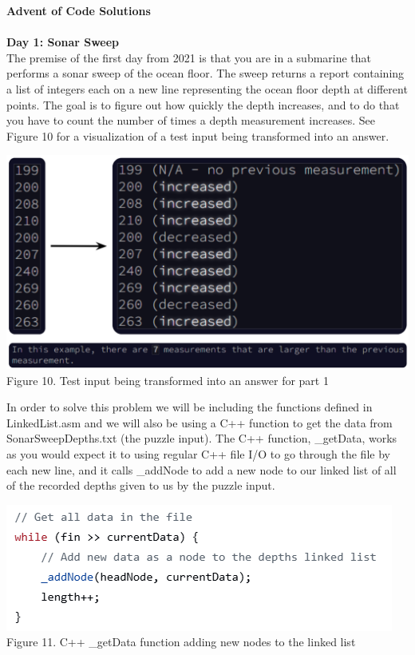 \documentclass[twoside]{article}
\begin{document}
\noindent \textbf{\Large Advent of Code Solutions} \\\\
\noindent \textbf{\large Day 1: Sonar Sweep} \\
\noindent The premise of the first day from 2021 is that you are in a submarine that performs a sonar sweep of the ocean floor. The sweep returns a report containing a list of integers each on a new line representing the ocean floor depth at different points. The goal is to figure out how quickly the depth increases, and to do that you have to count the number of times a depth measurement increases. See Figure 10 for a visualization of a test input being transformed into an answer.
\begin{center}
    \includegraphics[width=.75\textwidth]{images/day01TestInput.png}\\
    Figure 10. Test input being transformed into an answer for part 1
\end{center}

\noindent In order to solve this problem we will be including the functions defined in LinkedList.asm and we will also be using a C++ function to get the data from SonarSweepDepths.txt (the puzzle input). The C++ function, \_getData, works as you would expect it to using regular C++ file I/O to go through the file by each new line, and it calls \_addNode to add a new node to our linked list of all of the recorded depths given to us by the puzzle input.
\begin{center}
    \includegraphics[width=.75\textwidth]{images/cppAddNodeLoop.png}\\
    Figure 11. C++ \_getData function adding new nodes to the linked list
\end{center}
\end{document}
